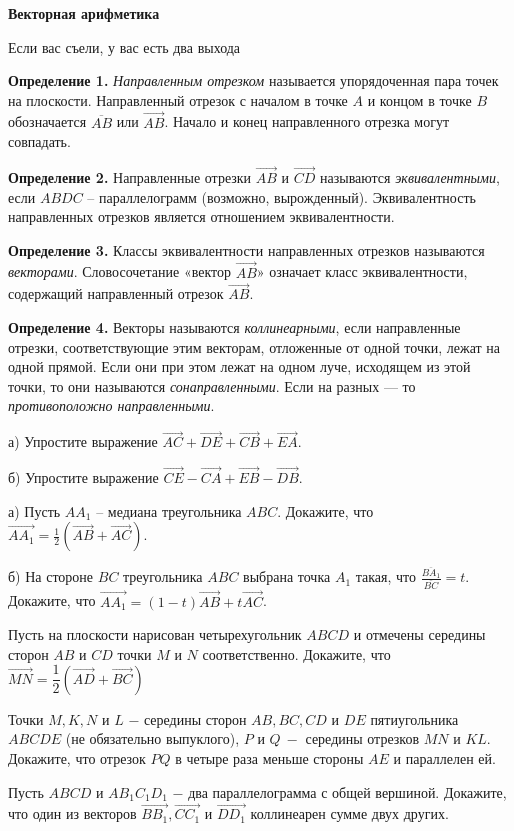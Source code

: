 \centerline{\bf \Huge Векторная арифметика}

\begin{flushright}
        \scriptsize{Если вас съели, у вас есть два выхода}
\end{flushright}

\textbf{Определение 1.} \textit{Направленным отрезком} называется упорядоченная пара точек на плоскости. Направленный отрезок с началом в точке \(A\) и концом в точке \(B\) обозначается \( \overline{AB} \) или \( \overrightarrow{AB} \). Начало и конец направленного отрезка могут совпадать.

\textbf{Определение 2.} Направленные отрезки \(\overrightarrow{AB}\) и \(\overrightarrow{CD}\) называются \textit{эквивалентными}, если \(ABDC\) -- параллелограмм (возможно, вырожденный). Эквивалентность направленных отрезков является отношением эквивалентности.

\textbf{Определение 3.} Классы эквивалентности направленных отрезков называются \textit{векторами}. Словосочетание «вектор \(\overrightarrow{AB}\)» означает класс эквивалентности, содержащий направленный отрезок \(\overrightarrow{AB}\).

\textbf{Определение 4.} Векторы называются \textit{коллинеарными}, если направленные отрезки, соответствующие этим векторам, отложенные от одной точки, лежат на одной прямой. Если они при этом лежат на одном луче, исходящем из этой точки, то они называются \textit{сонаправленными}. Если на разных --- то \textit{противоположно направленными}.

а) Упростите выражение \( \overrightarrow{AC} + \overrightarrow{DE} + \overrightarrow{CB} + \overrightarrow{EA} \).

\noindent
б) Упростите выражение \( \overrightarrow{CE} - \overrightarrow{CA} + \overrightarrow{EB} - \overrightarrow{DB} \).

а) Пусть \(AA_1\) -- медиана треугольника \(ABC\). Докажите, что \( \overrightarrow{AA_1} = \frac{1}{2} (\overrightarrow{AB} + \overrightarrow{AC}) \).

\noindent
б) На стороне \(BC\) треугольника \(ABC\) выбрана точка \(A_1\) такая, что \( \frac{\overline{BA_1}}{\overline{BC}} = t \). Докажите, что \( \overrightarrow{AA_1} = (1 - t) \overrightarrow{AB} + t \overrightarrow{AC} \).

Пусть на плоскости нарисован четырехугольник $ABCD$ и отмечены середины сторон $AB$ и $CD$ точки $M$ и $N$ соответственно. Докажите, что $\overrightarrow{MN} = \dfrac{1}{2}(\overrightarrow{AD} + \overrightarrow{BC})$

Точки $M, K, N$ и $L$ $-$ середины сторон $AB, BC, CD$ и $DE$ пятиугольника $ABCDE$ (не обязательно выпуклого), $P$ и $Q \ -$ середины отрезков $MN$ и $KL$. Докажите, что отрезок $PQ$ в четыре раза меньше стороны $AE$ и параллелен ей.

Пусть $ABCD$ и $AB_1C_1D_1$ $-$ два параллелограмма с общей вершиной. Докажите, что один из векторов $\overrightarrow{BB_1}, \overrightarrow{CC_1}$ и $\overrightarrow{DD_1}$ коллинеарен сумме двух других.




